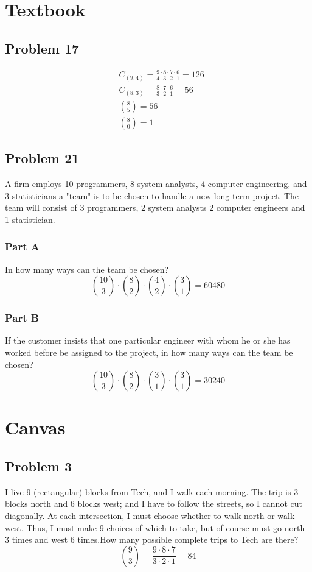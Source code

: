 \documentclass{article}
\begin{document}
\section*{Textbook}
\subsection*{Problem 17}
\begin{align}
    &C_{(9,4)} = \frac{9 \cdot 8 \cdot 7 \cdot 6}{4 \cdot 3 \cdot 2 \cdot 1} = 126 \\
    &C_{(8,3)} = \frac{8 \cdot 7 \cdot 6}{3 \cdot 2 \cdot 1} = 56\\
    &{8\choose{5}} = 56\\
    &{8\choose{0}} = 1
\end{align}
\subsection*{Problem 21}
A firm employs 10 programmers, 8 system analysts, 4 computer engineering, and 3 statisticians a "team" is to be chosen to handle a new long-term project. The team will consist of 3 programmers, 2 system analysts 2 computer engineers and 1 statistician.
\subsubsection*{Part A}
In how many ways can the team be chosen?
\begin{equation}
    {10\choose{3}} \cdot {8\choose{2}} \cdot {4\choose{2}} \cdot {3\choose{1}} = 60480
\end{equation}
\subsubsection*{Part B}
If the customer insists that one particular engineer with whom he or she has worked before be assigned to the project, in how many ways can the team be chosen?
\begin{equation}
    {10\choose{3}} \cdot {8\choose{2}} \cdot {3\choose{1}} \cdot {3\choose{1}} = 30240
\end{equation}
\section*{Canvas}
\subsection*{Problem 3}
I live 9 (rectangular) blocks from Tech, and I walk each morning. The trip is 3 blocks north and 6 blocks west; and I have to follow the streets, so I cannot cut diagonally. At each intersection, I must choose whether to walk north or walk west. Thus, I must make 9 choices of which to take, but of course must go north 3 times and west 6 times.How many possible complete trips to Tech are there?
\begin{equation}
    {{9}\choose{3}} = \frac{9 \cdot 8 \cdot 7}{3 \cdot 2 \cdot 1} = 84
\end{equation}
\end{document}
